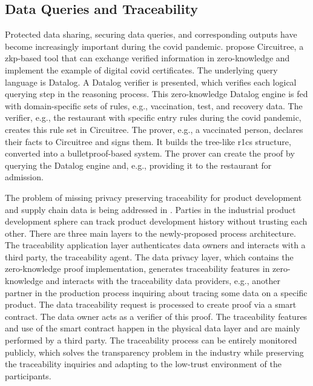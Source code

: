 \subsection{Data Queries and Traceability}
Protected data sharing, securing data queries, and corresponding outputs have become increasingly important during the \acrshort{covid} pandemic. \citet{Godden} propose Circuitree, a \acrshort{zkp}-based tool that can exchange verified information in zero-knowledge and implement the example of digital \acrshort{covid} certificates. The underlying query language is Datalog. A Datalog verifier is presented, which verifies each logical querying step in the reasoning process. This zero-knowledge Datalog engine is fed with domain-specific sets of rules, e.g., vaccination, test, and recovery data. The verifier, e.g., the restaurant with specific entry rules during the \acrshort{covid} pandemic, creates this rule set in Circuitree. The prover, e.g., a vaccinated person, declares their facts to Circuitree and signs them. It builds the tree-like \acrshort{r1cs} structure, converted into a bulletproof-based system. The prover can create the proof by querying the Datalog engine and, e.g., providing it to the restaurant for admission.

The problem of missing privacy preserving traceability for product development and supply chain data is being addressed in \citet{XueWang}. Parties in the industrial product development sphere can track product development history without trusting each other. There are three main layers to the newly-proposed process architecture. The traceability application layer authenticates data owners and interacts with a third party, the traceability agent. The data privacy layer, which contains the zero-knowledge proof implementation, generates traceability features in zero-knowledge and interacts with the traceability data providers, e.g., another partner in the production process inquiring about tracing some data on a specific product. The data traceability request is processed to create proof via a smart contract. The data owner acts as a verifier of this proof. The traceability features and use of the smart contract happen in the physical data layer and are mainly performed by a third party. The traceability process can be entirely monitored publicly, which solves the transparency problem in the industry while preserving the traceability inquiries and adapting to the low-trust environment of the participants.

